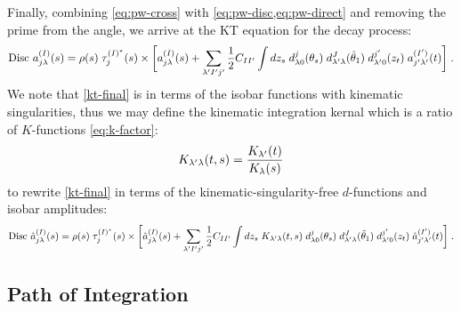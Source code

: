 Finally, combining \cref{eq:pw-cross} with \cref{eq:pw-disc,eq:pw-direct} and removing the prime from the angle, we arrive at the KT equation for the decay process:
  \begin{align}
    \label{kt-final}
    \text{Disc } a_{j\lambda}^{(I)}(s) = \rho(s) \; \tau^{(I)^*}_j(s) \times
    \bigg[
    a_{j\lambda}^{(I)}(s) +
    \sum_{{\lambda^\prime} {I^\prime} {j^\prime}} \frac{1}{2}C_{I{I^\prime}}
    \int d z_s \;  d_{\lambda0}^j(\theta_s) \; d_{{\lambda^\prime} \lambda}^J(\hat{\theta}_1) \;
       d_{{\lambda^\prime} 0}^{j^\prime}(z_t) \; a^{({I^\prime})}_{{j^\prime} {\lambda^\prime}}(t)
    \bigg] \; .
  \end{align}
We note that \cref{kt-final} is in terms of the isobar functions with kinematic singularities, thus we may define the kinematic integration kernal which is a ratio of \(K\)-functions \cref{eq:k-factor}:
  \begin{equation}
    K_{{\lambda^\prime}\lambda}(t,s) = \frac{K_{\lambda^\prime}(t)}{K_\lambda(s)}
  \end{equation}
to rewrite \cref{kt-final} in terms of the kinematic-singularity-free \(d\)-functions and isobar amplitudes:
  \begin{align}
    \label{kt-final-KSF}
    \text{Disc } \hat{a}_{j\lambda}^{(I)}(s) = \rho(s) \; \tau^{(I)^*}_j(s) \times
    \bigg[
    \hat{a}_{j\lambda}^{(I)}(s) +
    \sum_{{\lambda^\prime} {I^\prime} {j^\prime}} \frac{1}{2}C_{I{I^\prime}}
    \int d z_s \; K_{{\lambda^\prime}\lambda}(t,s) \; d_{\lambda0}^j(\theta_s) \; d_{{\lambda^\prime} \lambda}^J(\hat{\theta}_1) \;
       d_{{\lambda^\prime} 0}^{j^\prime}(z_t) \; \hat{a}^{({I^\prime})}_{{j^\prime} {\lambda^\prime}}(t)
    \bigg] \; .
  \end{align}
\subsection{Path of Integration}

